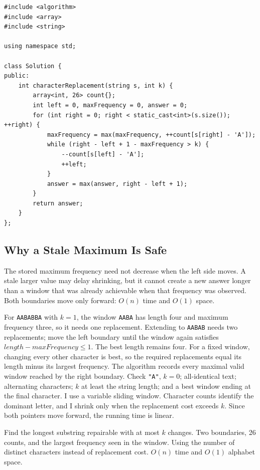 \begin{lstlisting}[style=compactcode,caption={Complete C++ solution: Character Replacement}]
#include <algorithm>
#include <array>
#include <string>

using namespace std;

class Solution {
public:
    int characterReplacement(string s, int k) {
        array<int, 26> count{};
        int left = 0, maxFrequency = 0, answer = 0;
        for (int right = 0; right < static_cast<int>(s.size()); ++right) {
            maxFrequency = max(maxFrequency, ++count[s[right] - 'A']);
            while (right - left + 1 - maxFrequency > k) {
                --count[s[left] - 'A'];
                ++left;
            }
            answer = max(answer, right - left + 1);
        }
        return answer;
    }
};
\end{lstlisting}

\subsection{Why a Stale Maximum Is Safe}
The stored maximum frequency need not decrease when the left side moves. A
stale larger value may delay shrinking, but it cannot create a new answer
longer than a window that was already achievable when that frequency was
observed. Both boundaries move only forward: \(O(n)\) time and \(O(1)\) space.

\lessonexpansion
  {For \texttt{AABABBA} with \(k=1\), the window \texttt{AABA} has length
   four and maximum frequency three, so it needs one replacement. Extending
   to \texttt{AABAB} needs two replacements; move the left boundary until the
   window again satisfies \(length-maxFrequency\le1\). The best length remains
   four.}
  {For a fixed window, changing every other character is best, so
   the required replacements equal its length minus its largest frequency.
   The algorithm records every maximal valid window reached by the right
   boundary.}
  {Check \texttt{"A"}, \(k=0\); all-identical text; alternating characters;
   \(k\) at least the string length; and a best window ending at the final
   character.}
  {I use a variable sliding window. Character counts identify the dominant
   letter, and I shrink only when the replacement cost exceeds \(k\). Since
   both pointers move forward, the running time is linear.}

\chaptercheckpoint
  {Find the longest substring repairable with at most $k$ changes.}
  {Two boundaries, 26 counts, and the largest frequency seen in the window.}
  {Using the number of distinct characters instead of replacement cost.}
  {$O(n)$ time and $O(1)$ alphabet space.}


